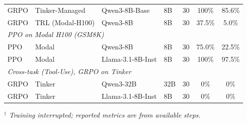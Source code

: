 \begin{table}[h]
\begin{tabular}{@{}l l l l r c c@{}}
\midrule
GRPO & Tinker-Managed & Qwen3-8B-Base & 8B & 30 & 100\% & 85.6\% \\
GRPO & TRL (Modal-H100) & Qwen3-8B & 8B & 30 & 37.5\% & 5.0\% \\
\midrule
\multicolumn{7}{l}{\textit{PPO on Modal H100 (GSM8K)}} \\
\midrule
PPO & Modal & Qwen3-8B & 8B & 30 & 75.0\% & 22.5\% \\
PPO & Modal & Llama-3.1-8B-Inst & 8B & 30 & 100\% & 97.5\% \\
\midrule
\multicolumn{7}{l}{\textit{Cross-task (Tool-Use), GRPO on Tinker}} \\
\midrule
GRPO & Tinker & Qwen3-32B & 32B & 30 & 0\% & 0\% \\
GRPO & Tinker & Llama-3.1-8B-Inst & 8B & 30 & 0\% & 0\% \\
\bottomrule
\end{tabular}
\end{table}

\noindent\textit{$^\dagger$ Training interrupted; reported metrics are
from available steps.}
